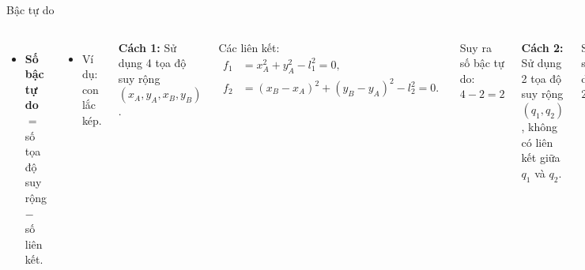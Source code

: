 \begin{frame}{Bậc tự do}
    \vspace{-4mm}
\begin{columns}
    \begin{itemize}
        \item \textbf{Số bậc tự do} \\
        \(= \) số tọa độ suy rộng \( - \) số liên kết.
    \end{itemize}
    \begin{itemize}
        \item Ví dụ: con lắc kép.
    \end{itemize}
    \textbf{Cách 1:} Sử dụng 4 tọa độ suy rộng \(\left( x_A, y_A, x_B, y_B \right)\).

    Các liên kết:
    \vspace{-2mm}
    \begin{align}
        f_1 &= x_A^2 + y_A^2 - l_1^2 = 0, \\
        f_2 &= \left( x_B - x_A \right)^2 + \left( y_B - y_A \right)^2 - l_2^2 = 0.
    \end{align}

    \vspace{-2mm}
    Suy ra số bậc tự do: \(4 - 2 = 2\)

    \textbf{Cách 2:} Sử dụng 2 tọa độ suy rộng \(\left( q_1, q_2 \right)\), không có liên kết giữa \(q_1\) và \(q_2\).

    Suy ra số bậc tự do: \(2 - 0 = 2\)

    
    \begin{figure}
        \centering
        \includegraphics[width=0.9\textwidth]{Figures/Double_pendulum.pdf}
        \caption{Con lắc kép.}
    \end{figure}
\end{columns}
\end{frame}


